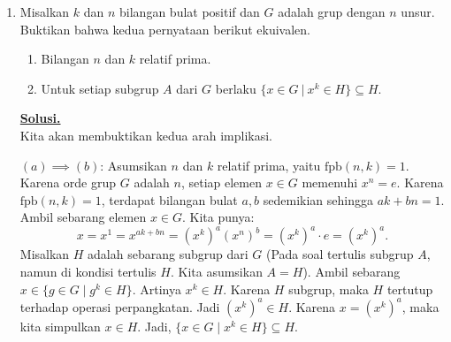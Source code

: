 \documentclass[12pt,twoside]{article}
\newenvironment{solution}
{
	\par\noindent\textbf{\underline{Solusi.}}\\
}
{
	\par
}
\begin{document}
\begin{enumerate}
        \begin{solution}
          Kita gunakan Rumus Integral Cauchy untuk turunan ke-$k$:
          \[ g^{(k)}(z_0) = \frac{k!}{2\pi i} \oint_{\gamma} \frac{g(z)}{(z-z_0)^{k+1}}\, dz \implies \oint_{\gamma} \frac{g(z)}{(z-z_0)^{k+1}}\, dz = \frac{2\pi i}{k!} g^{(k)}(z_0). \]

          Tinjau ruas kiri (LHS). Misalkan $g(z) = f^{(m)}(z)$. Integran memiliki penyebut $(z-z_0)^n$, yang bersesuaian dengan rumus Cauchy untuk $k = n-1$.
          \[ LHS = \oint_{\gamma} \frac{f^{(m)}(z)}{(z-z_0)^{(n-1)+1}}\, dz = \frac{2\pi i}{(n-1)!} \left( f^{(m)} \right)^{(n-1)}(z_0) = \frac{2\pi i}{(n-1)!} f^{(m+n-1)}(z_0). \]

          Tinjau ruas kanan (RHS). Misalkan $g(z) = f(z)$. Integran memiliki penyebut $(z-z_0)^{m+n}$, yang bersesuaian dengan rumus Cauchy untuk $k = m+n-1$.
          Integralnya adalah:
          \[ I_R = \oint_{\gamma} \frac{f(z)}{(z-z_0)^{(m+n-1)+1}}\, dz = \frac{2\pi i}{(m+n-1)!} f^{(m+n-1)}(z_0). \]
          Maka, nilai RHS adalah:
          \[ RHS = \frac{(m+n-1)!}{(n-1)!} \cdot I_R = \frac{(m+n-1)!}{(n-1)!} \cdot \frac{2\pi i}{(m+n-1)!} f^{(m+n-1)}(z_0) = \frac{2\pi i}{(n-1)!} f^{(m+n-1)}(z_0). \]
          Terlihat bahwa $LHS = RHS$. Terbukti.
        \end{solution}
  \item Misalkan $k$ dan $n$ bilangan bulat positif dan $G$ adalah grup dengan $n$ unsur. Buktikan bahwa kedua pernyataan berikut ekuivalen.
        \begin{enumerate}
          \item Bilangan $n$ dan $k$ relatif prima.
          \item Untuk setiap subgrup $A$ dari $G$ berlaku $\{x\in G~|~x^k\in H\}\subseteq H$.
        \end{enumerate}

        \begin{solution}
          Kita akan membuktikan kedua arah implikasi.

          $(a) \implies (b)$:
          Asumsikan $n$ dan $k$ relatif prima, yaitu $\text{fpb}(n, k) = 1$. Karena orde grup $G$ adalah $n$, setiap elemen $x \in G$ memenuhi $x^n = e$.
          Karena $\text{fpb}(n, k) = 1$, terdapat bilangan bulat $a, b$ sedemikian sehingga $ak + bn = 1$.
          Ambil sebarang elemen $x \in G$. Kita punya:
          \[ x = x^1 = x^{ak+bn} = (x^k)^a (x^n)^b = (x^k)^a \cdot e = (x^k)^a. \]
          Misalkan $H$ adalah sebarang subgrup dari $G$ (Pada soal tertulis subgrup $A$, namun di kondisi tertulis $H$. Kita asumsikan $A=H$).
          Ambil sebarang $x \in \{g \in G \mid g^k \in H\}$. Artinya $x^k \in H$.
          Karena $H$ subgrup, maka $H$ tertutup terhadap operasi perpangkatan. Jadi $(x^k)^a \in H$.
          Karena $x = (x^k)^a$, maka kita simpulkan $x \in H$.
          Jadi, $\{x\in G \mid x^k\in H\} \subseteq H$.


\end{solution}
\end{enumerate}
\end{document}
